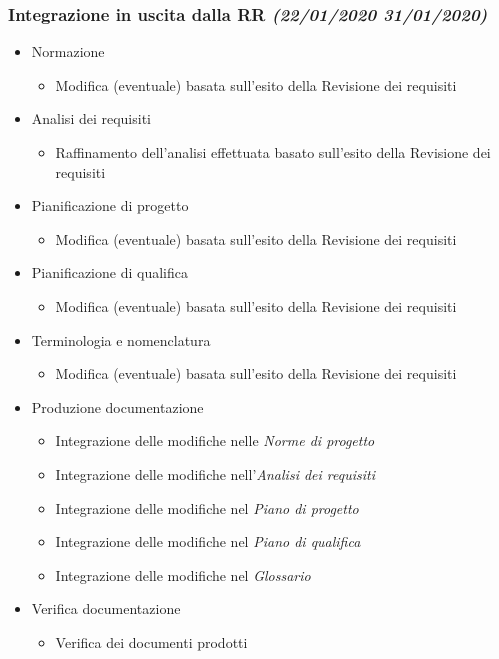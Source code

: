 \documentclass[../piano-di-progetto.tex]{subfiles}
\begin{document}
\subsubsection[Integrazione in uscita dalla RR]{Integrazione in uscita dalla RR {\normalsize\normalfont\itshape(22/01/2020  31/01/2020)}}%
\label{subs:integrazione_in_uscita_dalla_rr}
\begin{itemize}
  \item Normazione
  \begin{itemize}
    \item Modifica (eventuale) basata sull'esito della Revisione dei requisiti
  \end{itemize}
  \item Analisi dei requisiti
  \begin{itemize}
    \item Raffinamento dell'analisi effettuata basato sull'esito della Revisione dei requisiti
  \end{itemize}
  \item Pianificazione di progetto
  \begin{itemize}
    \item Modifica (eventuale) basata sull'esito della Revisione dei requisiti
  \end{itemize}
  \item Pianificazione di qualifica
  \begin{itemize}
    \item Modifica (eventuale) basata sull'esito della Revisione dei requisiti
  \end{itemize}
  \item Terminologia e nomenclatura
  \begin{itemize}
    \item Modifica (eventuale) basata sull'esito della Revisione dei requisiti
  \end{itemize}
  \item Produzione documentazione
  \begin{itemize}
    \item Integrazione delle modifiche nelle \textit{Norme di progetto}
    \item Integrazione delle modifiche nell'\textit{Analisi dei requisiti}
    \item Integrazione delle modifiche nel \textit{Piano di progetto}
    \item Integrazione delle modifiche nel \textit{Piano di qualifica}
    \item Integrazione delle modifiche nel \textit{Glossario}
  \end{itemize}
  \item Verifica documentazione
  \begin{itemize}
    \item Verifica dei documenti prodotti
  \end{itemize}
\end{itemize}
\end{document}
